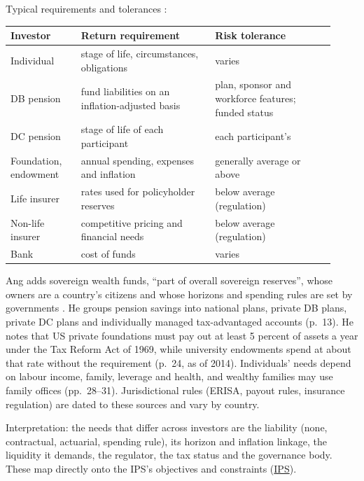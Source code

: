 \begin{qfdefinition}
 Typical requirements and tolerances \citep[chap.~1, Exhibit~1-3, p.~15]{managing-investment-portfolios-2007}:
\begin{center}\small
\begin{tabular}{@{}p{0.2\linewidth}p{0.38\linewidth}p{0.34\linewidth}@{}}
\toprule
Investor & Return requirement & Risk tolerance \\
\midrule
Individual & stage of life, circumstances, obligations & varies \\
DB pension & fund liabilities on an inflation-adjusted basis & plan, sponsor and workforce features; funded status \\
DC pension & stage of life of each participant & each participant's \\
Foundation, endowment & annual spending, expenses and inflation & generally average or above \\
Life insurer & rates used for policyholder reserves & below average (regulation) \\
Non-life insurer & competitive pricing and financial needs & below average (regulation) \\
Bank & cost of funds & varies \\
\bottomrule
\end{tabular}
\end{center}

 Ang adds sovereign wealth funds, ``part of overall sovereign reserves'', whose owners are a country's citizens and whose horizons and spending rules are set by governments \citep[chap.~1, pp.~4--5]{s7-ang}. He groups pension savings into national plans, private DB plans, private DC plans and individually managed tax-advantaged accounts (p.~13). He notes that US private foundations must pay out at least 5 percent of assets a year under the Tax Reform Act of 1969, while university endowments spend at about that rate without the requirement (p.~24, as of 2014). Individuals' needs depend on labour income, family, leverage and health, and wealthy families may use family offices (pp.~28--31). Jurisdictional rules (ERISA, payout rules, insurance regulation) are dated to these sources and vary by country.

 Interpretation: the needs that differ across investors are the liability (none, contractual, actuarial, spending rule), its horizon and inflation linkage, the liquidity it demands, the regulator, the tax status and the governance body. These map directly onto the IPS's objectives and constraints (\hyperref[meth:investment-policy-statement]{IPS}).


\end{qfdefinition}
